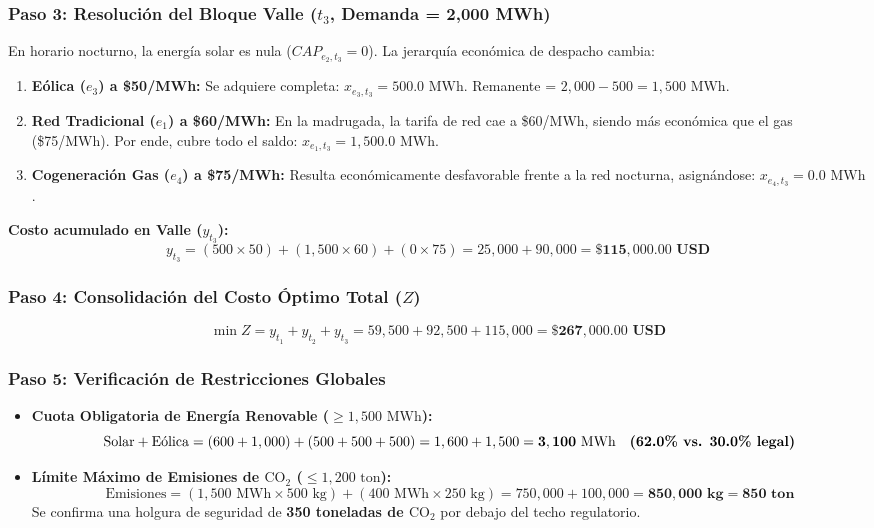 \documentclass[11pt,a4paper]{article}
\begin{document}
\subsubsection{Paso 3: Resolución del Bloque Valle ($t_3$, Demanda = 2,000 MWh)}
En horario nocturno, la energía solar es nula ($CAP_{e_2, t_3} = 0$). La jerarquía económica de despacho cambia:
\begin{enumerate}
    \item \textbf{Eólica ($e_3$) a \$50/MWh:} Se adquiere completa: $x_{e_3, t_3} = 500.0\text{ MWh}$. Remanente = $2,000 - 500 = 1,500\text{ MWh}$.
    \item \textbf{Red Tradicional ($e_1$) a \$60/MWh:} En la madrugada, la tarifa de red cae a \$60/MWh, siendo más económica que el gas (\$75/MWh). Por ende, cubre todo el saldo: $x_{e_1, t_3} = 1,500.0\text{ MWh}$.
    \item \textbf{Cogeneración Gas ($e_4$) a \$75/MWh:} Resulta económicamente desfavorable frente a la red nocturna, asignándose: $x_{e_4, t_3} = 0.0\text{ MWh}$.
\end{enumerate}
\textbf{Costo acumulado en Valle ($y_{t_3}$):}
\begin{equation}
y_{t_3} = (500 \times 50) + (1,500 \times 60) + (0 \times 75) = 25,000 + 90,000 = \mathbf{\$115,000.00\text{ USD}}
\end{equation}

\subsubsection{Paso 4: Consolidación del Costo Óptimo Total ($Z$)}
\begin{equation}
\min Z = y_{t_1} + y_{t_2} + y_{t_3} = 59,500 + 92,500 + 115,000 = \mathbf{\$267,000.00\text{ USD}}
\end{equation}

\subsubsection{Paso 5: Verificación de Restricciones Globales}
\begin{itemize}
    \item \textbf{Cuota Obligatoria de Energía Renovable ($\ge 1,500\text{ MWh}$):}
    $$\text{Solar} + \text{Eólica} = (600 + 1,000) + (500 + 500 + 500) = 1,600 + 1,500 = \mathbf{3,100\text{ MWh}} \quad \text{\textbf{(62.0\% vs. 30.0\% legal)}}$$
    \item \textbf{Límite Máximo de Emisiones de $\text{CO}_2$ ($\le 1,200\text{ ton}$):}
    $$\text{Emisiones} = (1,500 \text{ MWh} \times 500\text{ kg}) + (400 \text{ MWh} \times 250\text{ kg}) = 750,000 + 100,000 = \mathbf{850,000\text{ kg} = 850\text{ ton}}$$
    Se confirma una holgura de seguridad de \textbf{350 toneladas de $\text{CO}_2$} por debajo del techo regulatorio.
\end{itemize}
\end{document}
